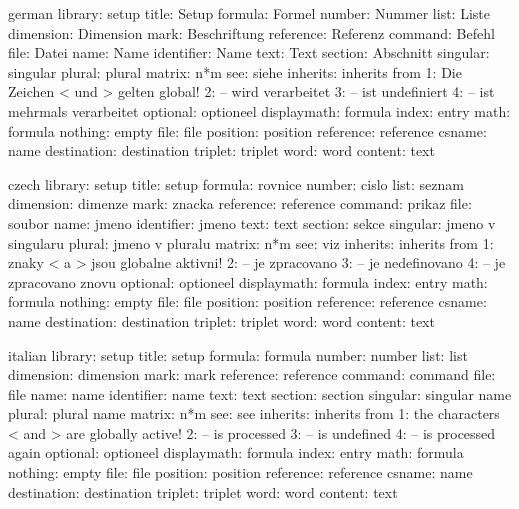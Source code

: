 \startmessages  german library: setup
        title:  Setup
      formula:  Formel
       number:  Nummer
         list:  Liste
    dimension:  Dimension
         mark:  Beschriftung
    reference:  Referenz
      command:  Befehl
         file:  Datei
         name:  Name
   identifier:  Name
         text:  Text
      section:  Abschnitt
     singular:  singular
       plural:  plural
       matrix:  n*m
          see:  siehe
     inherits:  inherits from
            1:  Die Zeichen < und > gelten global!
            2:  -- wird verarbeitet
            3:  -- ist undefiniert
            4:  -- ist mehrmals verarbeitet
     optional:  optioneel
  displaymath:  formula
        index:  entry
         math:  formula
      nothing:  empty
         file:  file
     position:  position
    reference:  reference
       csname:  name
  destination:  destination
      triplet:  triplet
         word:  word
      content:  text
\stopmessages

\startmessages  czech  library: setup
        title:  setup
      formula:  rovnice
       number:  cislo
         list:  seznam
    dimension:  dimenze
         mark:  znacka
    reference:  reference
      command:  prikaz
         file:  soubor
         name:  jmeno
   identifier:  jmeno
         text:  text
      section:  sekce
     singular:  jmeno v singularu
       plural:  jmeno v pluralu
       matrix:  n*m
          see:  viz
     inherits:  inherits from
            1:  znaky < a > jsou globalne aktivni!
            2:  -- je zpracovano
            3:  -- je nedefinovano
            4:  -- je zpracovano znovu
     optional:  optioneel
  displaymath:  formula
        index:  entry
         math:  formula
      nothing:  empty
         file:  file
     position:  position
    reference:  reference
       csname:  name
  destination:  destination
      triplet:  triplet
         word:  word
      content:  text
\stopmessages

\startmessages  italian library: setup
        title:  setup
      formula:  formula
       number:  number
         list:  list
    dimension:  dimension
         mark:  mark
    reference:  reference
      command:  command
         file:  file
         name:  name
   identifier:  name
         text:  text
      section:  section
     singular:  singular name
       plural:  plural name
       matrix:  n*m
          see:  see
     inherits:  inherits from
            1:  the characters < and > are globally active!
            2:  -- is processed
            3:  -- is undefined
            4:  -- is processed again
     optional:  optioneel
  displaymath:  formula
        index:  entry
         math:  formula
      nothing:  empty
         file:  file
     position:  position
    reference:  reference
       csname:  name
  destination:  destination
      triplet:  triplet
         word:  word
      content:  text
\stopmessages

